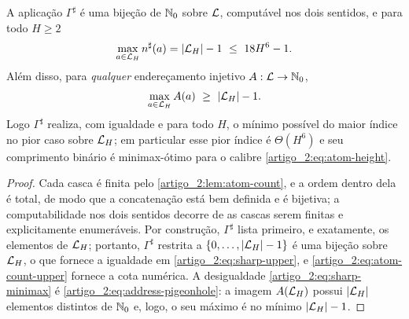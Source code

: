 \begin{theorem}\label{map:artigo_2:3.7}\label{artigo_2:thm:sharp-optimal}
A aplicação $\Gamma^\sharp$ é uma bijeção de $\mathbb{N}_0$ sobre $\mathcal{L}$, computável nos dois sentidos, e para todo $H\ge2$
\begin{equation}
 \max_{a\in\Library_H}n^\sharp(a)=|\Library_H|-1\ \le\ 18H^6-1 .
 \label{artigo_2:eq:sharp-upper}
\end{equation}
Além disso, para \emph{qualquer} endereçamento injetivo $A:\mathcal{L}\to\mathbb{N}_0$,
\begin{equation}
 \max_{a\in\mathcal{L}_H}A(a)\ \ge\ |\mathcal{L}_H|-1 .
 \label{artigo_2:eq:sharp-minimax}
\end{equation}
Logo $\Gamma^\sharp$ realiza, com igualdade e para todo $H$, o mínimo possível
do maior índice no pior caso sobre $\mathcal{L}_H$; em particular esse pior
índice é $\Theta(H^6)$ e seu comprimento binário é minimax-ótimo para o
calibre \eqref{artigo_2:eq:atom-height}.
\end{theorem}

\begin{proof}
Cada casca é finita pelo \cref{artigo_2:lem:atom-count}, e a ordem dentro dela é total, de modo que a concatenação está bem definida e é bijetiva; a computabilidade nos dois sentidos decorre de as cascas serem finitas e explicitamente enumeráveis. Por construção, $\Gamma^\sharp$ lista primeiro, e exatamente, os elementos de $\mathcal{L}_H$; portanto, $\Gamma^\sharp$ restrita a $\{0,\ldots,|\mathcal{L}_H|-1\}$ é uma bijeção sobre $\mathcal{L}_H$, o que fornece a igualdade em \eqref{artigo_2:eq:sharp-upper}, e \eqref{artigo_2:eq:atom-count-upper} fornece a cota numérica. A desigualdade \eqref{artigo_2:eq:sharp-minimax} é \eqref{artigo_2:eq:address-pigeonhole}: a imagem $A(\mathcal{L}_H)$ possui $|\mathcal{L}_H|$ elementos distintos de $\mathbb{N}_0$ e, logo, o seu máximo é no mínimo $|\mathcal{L}_H|-1$.
\end{proof}

